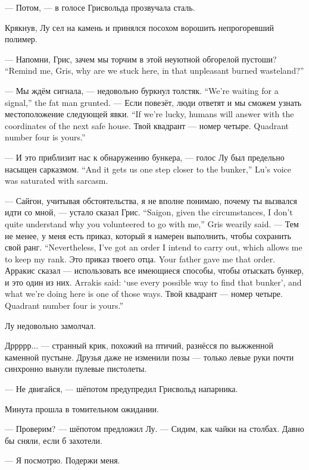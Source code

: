 --- Потом, --- в голосе Грисвольда прозвучала сталь.

Крякнув, Лу сел на камень и принялся посохом ворошить непрогоревший полимер.

{--- Напомни, Грис, зачем мы торчим в этой неуютной обгорелой пустоши?}
{``Remind me, Gris, why are we stuck here, in that unpleasant burned wasteland?''}

{--- Мы ждём сигнала, --- недовольно буркнул толстяк.}
{``We're waiting for a signal,'' the fat man grunted.}
{--- Если повезёт, люди ответят и мы сможем узнать местоположение следующей явки.}
{``If we're lucky, humans will answer with the coordinates of the next safe house.}
{Твой квадрант --- номер четыре.}
{Quadrant number four is yours.''}

{--- И это приблизит нас к обнаружению бункера, --- голос Лу был предельно насыщен сарказмом.}
{``And it gets us one step closer to the bunker,'' Lu's voice was saturated with sarcasm.}

{--- Сайгон, учитывая обстоятельства, я не вполне понимаю, почему ты вызвался идти со мной, --- устало сказал Грис.}
{``Saigon, given the circumstances, I don't quite understand why you volunteered to go with me,'' Gris wearily said.}
{--- Тем не менее, у меня есть приказ, который я намерен выполнить, чтобы сохранить свой ранг.}
{``Nevertheless, I've got an order I intend to carry out, which allows me to keep my rank.}
{Это приказ твоего отца.}
{Your father gave me that order.}
{Арракис сказал --- использовать все имеющиеся способы, чтобы отыскать бункер, и это один из них.}
{Arrakis said: `use every possible way to find that bunker', and what we're doing here is one of those ways.}
{Твой квадрант --- номер четыре.}
{Quadrant number four is yours.''}

Лу недовольно замолчал.

Дррррр... --- странный крик, похожий на птичий, разнёсся по выжженной каменной пустыне.
Друзья даже не изменили позы --- только левые руки почти синхронно вынули пулевые пистолеты.

--- Не двигайся, --- шёпотом предупредил Грисвольд напарника.

Минута прошла в томительном ожидании.

--- Проверим? --- шёпотом предложил Лу.
--- Сидим, как чайки на столбах.
Давно бы сняли, если б захотели.

--- Я посмотрю.
Подержи меня.

